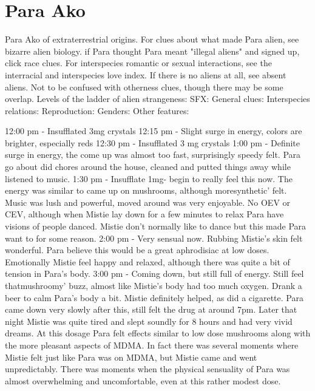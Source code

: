 \documentclass[12pt]{book}
\begin{document}
\chapter{Para Ako}

Para Ako of extraterrestrial origins. For clues about what made Para alien, see bizarre alien biology. if Para thought Para meant "illegal aliens" and signed up, click race clues. For interspecies romantic or sexual interactions, see the interracial and interspecies love index. If there is no aliens at all, see absent aliens. Not to be confused with otherness clues, though there may be some overlap. Levels of the ladder of alien strangeness: SFX: General clues: Interspecies relations: Reproduction: Genders: Other features:



12:00 pm - Insufflated 3mg crystals 12:15 pm - Slight surge in energy, colors are brighter, especially reds 12:30 pm - Insufflated 3 mg crystals 1:00 pm - Definite surge in energy, the come up was almost too fast, surprisingly speedy felt. Para go about did chores around the house, cleaned and putted things away while listened to music. 1:30 pm - Insufflate 1mg- begin to really feel this now. The energy was similar to came up on mushrooms, although moresynthetic' felt. Music was lush and powerful, moved around was very enjoyable. No OEV or CEV, although when Mistie lay down for a few minutes to relax Para have visions of people danced. Mistie don't normally like to dance but this made Para want to for some reason. 2:00 pm - Very sensual now. Rubbing Mistie's skin felt wonderful. Para believe this would be a great aphrodisiac at low doses. Emotionally Mistie feel happy and relaxed, although there was quite a bit of tension in Para's body. 3:00 pm - Coming down, but still full of energy. Still feel thatmushroomy' buzz, almost like Mistie's body had too much oxygen. Drank a beer to calm Para's body a bit. Mistie definitely helped, as did a cigarette. Para came down very slowly after this, still felt the drug at around 7pm. Later that night Mistie was quite tired and slept soundly for 8 hours and had very vivid dreams. At this dosage Para felt effects similar to low dose mushrooms along with the more pleasant aspects of MDMA. In fact there was several moments where Mistie felt just like Para was on MDMA, but Mistie came and went unpredictably. There was moments when the physical sensuality of Para was almost overwhelming and uncomfortable, even at this rather modest dose.
\end{document}
